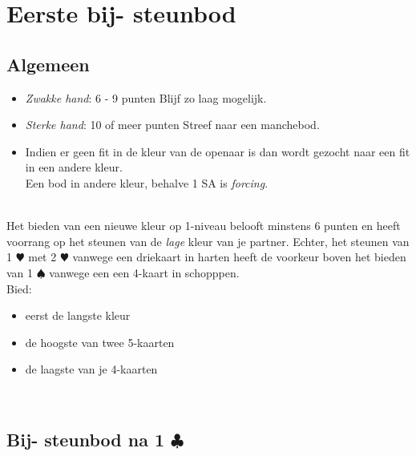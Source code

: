 \documentclass[12pt,a4paper]{report}
\begin{document}

\chapter{Eerste bij-  steunbod}
\section{Algemeen}
\begin{itemize}
	\item \emph{Zwakke hand}: 6 - 9 punten \newline
	       Blijf zo laag mogelijk.
	       
	\item \emph{Sterke hand}: 10 of meer punten	\newline
	      Streef naar een manchebod.
	      
	\item Indien er geen fit in de kleur van de openaar is
	      dan wordt gezocht naar een fit in een andere kleur.
	      \\
	      Een bod in andere kleur, behalve 1 SA is \emph{forcing}.	       
\end{itemize}
\ \\
Het bieden van een nieuwe kleur  op 1-niveau belooft
minstens 6 punten en heeft voorrang op het steunen 
van de \emph{lage} kleur van je partner.
Echter, het steunen van 1 $\varheartsuit$ met 2 $\varheartsuit$ vanwege 
een driekaart in harten heeft de voorkeur boven het bieden van 1 $\spadesuit$
vanwege een een 4-kaart in schopppen.
\\
Bied:
\begin{itemize}
	\item eerst de langste kleur
	\item de hoogste van twee 5-kaarten
	\item de laagste van je 4-kaarten
\end{itemize}
\ \\

\section{Bij- steunbod na 1 $\clubsuit$}
\end{document}
